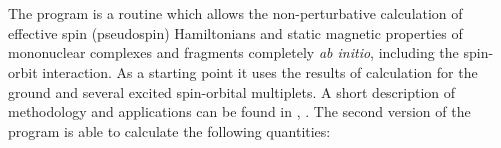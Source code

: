 \section{}

\label{UG:sec:single_aniso}

The  program is a routine which allows the non-perturbative calculation of effective spin (pseudospin) Hamiltonians and static magnetic properties of mononuclear complexes and fragments completely \textit {ab initio}, including the spin-orbit interaction. As a starting point it uses the results of  calculation for the ground and several excited spin-orbital multiplets. A short description of methodology and  applications can be found in \cite{Chibotaru:1}, \cite{Chibotaru:2}. The second version of the  program is able to calculate the following quantities:

